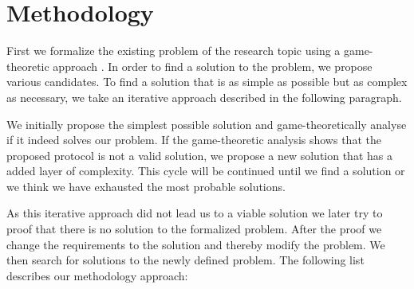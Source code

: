 \documentclass{cacthesis}
\newcommand{\authnote}[3]{{ \footnotesize \textbf{#1[#2: #3]~}}}
\newcommand{\niknote}[1]{\authnote{\color{red}}{Nikos}{#1}}
\begin{document}
	\section{Methodology}
	\label{sec:methodology}
	First we formalize the existing problem of the research topic using a game-theoretic approach \cite{leyton-brown_essentials_2008}. In order to find a solution to the problem, we propose various candidates.  To find a solution that is as simple as possible but as complex as necessary, we take an iterative approach described in the following paragraph.\newline
	
	We initially propose the simplest possible solution and game-theoretically analyse if it indeed solves our problem. 
	If the game-theoretic analysis shows that the proposed protocol is not a valid solution, we propose a new solution that has a added layer of complexity. This cycle will be continued until we find a solution or we think we have exhausted the most probable solutions. \newline
	
	As this iterative approach did not lead us to a viable solution we later try to proof that there is no solution to the formalized problem. After the proof we change the requirements to the solution
	and thereby modify the problem. We then search for solutions to the newly defined problem. The following list describes our methodology approach:
\end{document}
